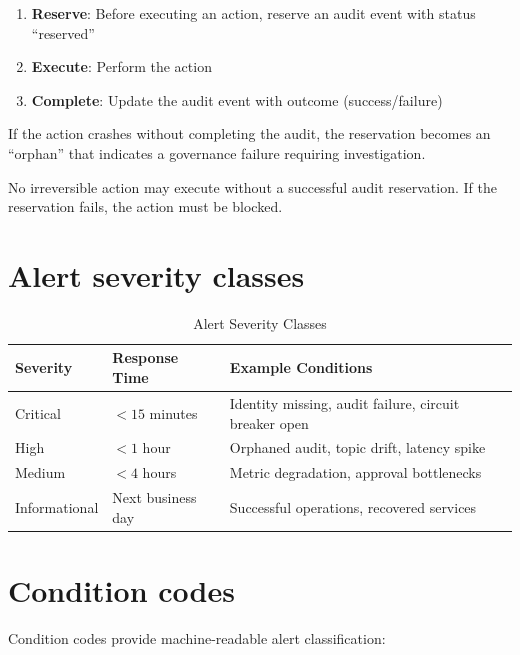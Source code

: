 \begin{enumerate}
  \item \textbf{Reserve}: Before executing an action, reserve an audit event
        with status ``reserved''
  \item \textbf{Execute}: Perform the action
  \item \textbf{Complete}: Update the audit event with outcome (success/failure)
\end{enumerate}

If the action crashes without completing the audit, the reservation becomes
an ``orphan'' that indicates a governance failure requiring investigation.

\begin{tcolorbox}[colback=sgamber!10,colframe=sgamber!70,title=\faIcon{exclamation-triangle} Critical Requirement]
No irreversible action may execute without a successful audit reservation.
If the reservation fails, the action must be blocked.
\end{tcolorbox}

\section{Alert severity classes}

\begin{table}[htbp]
\centering
\caption{Alert Severity Classes}
\label{tab:alert-classes}
\begin{tabularx}{\textwidth}{@{}l l X@{}}
\toprule
\textbf{Severity} & \textbf{Response Time} & \textbf{Example Conditions} \\
\midrule
Critical & $< 15$ minutes & Identity missing, audit failure, circuit breaker open \\
High & $< 1$ hour & Orphaned audit, topic drift, latency spike \\
Medium & $< 4$ hours & Metric degradation, approval bottlenecks \\
Informational & Next business day & Successful operations, recovered services \\
\bottomrule
\end{tabularx}
\end{table}

\section{Condition codes}

Condition codes provide machine-readable alert classification:

